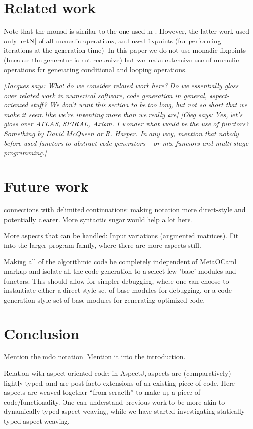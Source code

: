 \documentclass{llncs}
\newcommand{\oleg}[1]{{\it [Oleg says: #1]}}
\newcommand{\jacques}[1]{{\it [Jacques says: #1]}}
\begin{document}
\section{Related work}\label{related}

Note that the monad is similar to the one used in \cite{KiselyovTaha}.
However, the latter work used only |retN| of all monadic operations,
and used fixpoints (for performing iterations at the generation time).
In this paper we do not use monadic fixpoints (because the generator
is not recursive) but we make extensive use of monadic operations for
generating conditional and looping operations.

\jacques{What do we consider \emph{related work} here?  Do we essentially gloss 
over related work in numerical software, code generation in general,
aspect-oriented stuff?  We don't want this section to be too long, but
not so short that we make it seem like we're inventing more than we
really are}
\oleg{Yes, let's gloss over ATLAS, SPIRAL, Axiom. I wonder what would
  be the use of functors? Something by David McQueen or R. Harper.
  In any way, mention that nobody before used functors to abstract
  code generators -- or mix functors and multi-stage programming.}


\section{Future work}\label{future}
connections with delimited continuations: making notation
more direct-style and potentially clearer.  More syntactic sugar
would help a lot here.

More aspects that can be handled: Input variations (augmented
matrices). Fit into the larger program family, where there are
more aspects still.

Making all of the algorithmic code be completely independent of 
MetaOCaml markup and isolate all the code generation to a select
few 'base' modules and functors.  This should allow for simpler
debugging, where one can choose to instantiate either a direct-style
set of base modules for debugging, or a code-generation style set
of base modules for generating optimized code.

\section{Conclusion}\label{conclusion}
Mention the mdo notation. Mention it into the introduction.

Relation with aspect-oriented code: in AspectJ, aspects are (comparatively)
lightly typed, and are post-facto extensions of an existing piece of
code.  Here aspects are weaved together ``from scracth'' to make up a
piece of code/functionality.  One can understand previous work to be
more akin to dynamically typed aspect weaving, while we have started
investigating statically typed aspect weaving.
\end{document}
